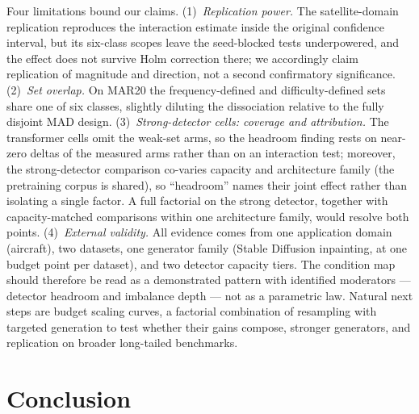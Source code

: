 \documentclass[preprint,12pt,authoryear]{elsarticle}
\begin{document}
Four limitations bound our claims. (1)~\emph{Replication power.} The
satellite-domain replication reproduces the interaction estimate inside
the original confidence interval, but its six-class scopes leave the
seed-blocked tests underpowered, and the effect does not survive Holm
correction there; we accordingly claim replication of magnitude and
direction, not a second confirmatory significance. (2)~\emph{Set
overlap.} On MAR20 the frequency-defined and difficulty-defined sets
share one of six classes, slightly diluting the dissociation relative to
the fully disjoint MAD design. (3)~\emph{Strong-detector cells: coverage
and attribution.} The transformer cells omit the weak-set arms, so the
headroom finding rests on near-zero deltas of the measured arms rather
than on an interaction test; moreover, the strong-detector comparison
co-varies capacity and architecture family (the pretraining corpus is
shared), so ``headroom'' names their joint effect rather than isolating
a single factor. A full factorial on the strong detector, together with
capacity-matched comparisons within one architecture family, would
resolve both points. (4)~\emph{External validity.} All evidence comes
from one application domain (aircraft), two datasets, one generator
family (Stable Diffusion inpainting, at one budget point per dataset),
and two detector capacity tiers. The condition map should therefore be
read as a demonstrated pattern with identified moderators --- detector
headroom and imbalance depth --- not as a parametric law. Natural next
steps are budget scaling curves, a factorial combination of resampling
with targeted generation to test whether their gains compose, stronger
generators, and replication on broader long-tailed benchmarks.

\section{Conclusion}\label{sec:conclusion}
\end{document}
